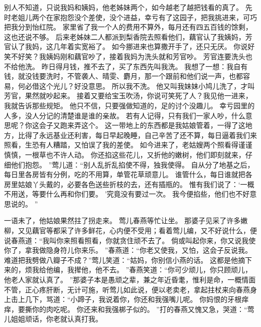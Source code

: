 别人不知道，只说我妈和姨妈，他老姊妹两个，如今越老了越把钱看的真了。
先时老姐儿两个在家抱怨没个差使，没个进益，幸亏有了这园子，把我挑进来，可巧把我分到怡红院。
家里省了我一个人的费用不算外，每月还有四五百钱的馀剩，这也还说不够。
后来老姊妹二人都派到梨香院去照看他们，藕官认了我姨妈，芳官认了我妈，这几年着实宽裕了。
如今挪进来也算撒开手了，还只无厌。
你说好笑不好笑？我姨妈刚和藕官吵了，接着我妈为洗头就和芳官吵。
芳官连要洗头也不给他洗。
昨日得月钱，推不去了，买了东西先叫我洗。
我想了一想：我自有钱，就没钱要洗时，不管袭人、晴雯、麝月，那一个跟前和他们说一声，也都容易，何必借这个光儿？好没意思。
所以我不洗。
他又叫我妹妹小鸠儿洗了，才叫芳官，果然就吵起来。
接着又要给宝玉吹汤，你说可笑死了人？我见他一进来，我就告诉那些规矩。
他只不信，只要强做知道的，足的讨个没趣儿。
幸亏园里的人多，没人分记的清楚谁是谁的亲故。
若有人记得，只有我们一家人吵，什么意思呢？你这会子又跑来弄这个。
这一带地上的东西都是我姑娘管着，一得了这地方，比得了永远基业还利害，每日早起晚睡，自己辛苦了还不算，每日逼着我们来照看，生恐有人糟踏，又怕误了我的差使。
如今进来了，老姑嫂两个照看得谨谨慎慎，一根草也不许人动。
你还掐这些花儿，又折他的嫩树，他们即刻就来，仔细他们抱怨。
”莺儿道：“别人乱折乱掐使不得，独我使得。
自从分了地基之后，每日里各房皆有分例，吃的不用算，单管花草顽意儿。
谁管什么，每日谁就把各房里姑娘丫头戴的，必要各色送些折枝的去，还有插瓶的。
惟有我们说了：‘一概不用送，等要什么再和你们要。
’究竟没有要过一次。
我今便掐些，他们也不好意思说的。
”\par
一语未了，他姑娘果然拄了拐走来。
莺儿春燕等忙让坐。
那婆子见采了许多嫩柳，又见藕官等都采了许多鲜花，心内便不受用；看着莺儿编，又不好说什么，便说春燕道：“我叫你来照看照看，你就贪住顽不去了。
倘或叫起你来，你又说我使你了，拿我做隐身符儿你来乐。
”春燕道：“你老又使我，又怕，这会子反说我。
难道把我劈做八瓣子不成？”莺儿笑道：“姑妈，你别信小燕的话。
这都是他摘下来的，烦我给他编，我撵他，他不去。
”春燕笑道：“你可少顽儿，你只顾顽儿，他老人家就认真了。
”那婆子本是愚顽之辈，兼之年近昏耄，惟利是命，一概情面不管，正心疼肝断，无计可施，听莺儿如此说，便以老卖老，拿起拄杖来向春燕身上击上几下，骂道：“小蹄子，我说着你，你还和我强嘴儿呢。
你妈恨的牙根痒痒，要撕你的肉吃呢。
你还来和我强梆子似的。
”打的春燕又愧又急，哭道：“莺儿姐姐顽话，你老就认真打我。
